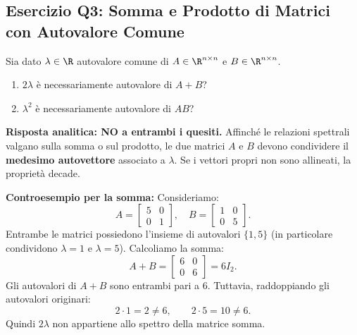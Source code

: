 \subsection{Esercizio Q3: Somma e Prodotto di Matrici con Autovalore Comune}

\begin{example}
\label{ex:q3-somma-prodotto}
Sia dato $\lambda \in \R$ autovalore comune di $A \in \R^{n \times n}$ e $B \in \R^{n \times n}$.
\begin{enumerate}
    \item $2\lambda$ \`e necessariamente autovalore di $A + B$?
    \item $\lambda^2$ \`e necessariamente autovalore di $AB$?
\end{enumerate}

\noindent\textbf{Risposta analitica: NO a entrambi i quesiti.}
Affinch\'e le relazioni spettrali valgano sulla somma o sul prodotto, le due matrici $A$ e $B$ devono condividere il \textbf{medesimo autovettore} associato a $\lambda$. Se i vettori propri non sono allineati, la propriet\`a decade.

\medskip
\noindent\textbf{Controesempio per la somma:}
Consideriamo:
\begin{equation}
    A = \begin{bmatrix} 5 & 0 \\ 0 & 1 \end{bmatrix}, \quad B = \begin{bmatrix} 1 & 0 \\ 0 & 5 \end{bmatrix}.
\end{equation}
Entrambe le matrici possiedono l'insieme di autovalori $\{1, 5\}$ (in particolare condividono $\lambda = 1$ e $\lambda = 5$). Calcoliamo la somma:
\begin{equation}
    A + B = \begin{bmatrix} 6 & 0 \\ 0 & 6 \end{bmatrix} = 6 I_2.
\end{equation}
Gli autovalori di $A + B$ sono entrambi pari a $6$. Tuttavia, raddoppiando gli autovalori originari:
\begin{equation}
    2 \cdot 1 = 2 \neq 6, \qquad 2 \cdot 5 = 10 \neq 6.
\end{equation}
Quindi $2\lambda$ non appartiene allo spettro della matrice somma.


\end{example}
